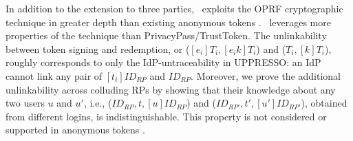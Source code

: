 In addition to the extension to three parties,
    \usso\ exploits the OPRF cryptographic technique in greater depth than existing anonymous tokens \cite{privacypass,trusttoken}.
\usso\ leverages more properties of the technique than PrivacyPass/TrustToken.
The unlinkability between token signing and redemption, or ($[e_i]T_i, [e_ik]T_i$) and  ($T_i, [k]T_i$), roughly corresponds to only the IdP-untraceability in UPPRESSO: an IdP cannot link any pair of $[t_i]ID_{RP}$ and $ID_{RP}$.  %
Moreover,
    we prove the additional unlinkability across colluding RPs by showing that their knowledge about any two users $u$ and $u'$, i.e., ($ID_{RP}, t, [u]ID_{RP}$) and ($ID_{RP'}, t', [u']ID_{RP'}$), obtained from different logins, is indistinguishable.
This property is not considered or supported in anonymous tokens \cite{privacypass,trusttoken}.




